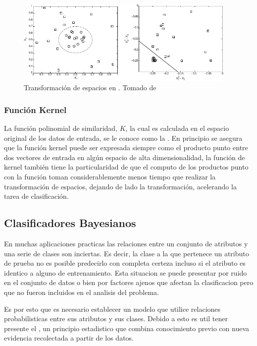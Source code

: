 \begin{figure}[H]
   \centering
   \includegraphics[width=0.95\textwidth]{Figures/svm-nonlinear-transform.pdf}
   \decoRule
   \caption[Transformación de espacios en ]{Transformación de espacios en . Tomado de \cite{tan2005introduction}}
   \label{fig:svm-nonlinear-transforms}
\end{figure}

\subsubsection{Función Kernel}
La función polinomial de similaridad, $K$, la cual es calculada en el espacio original de los datos de entrada, se le conoce como la . En principio se asegura que la función kernel puede ser expresada siempre como el producto punto entre dos vectores de entrada en algún espacio de alta dimensionalidad, la función de kernel también tiene la particularidad de que el computo de los productos punto con la función toman considerablemente menos tiempo que realizar la transformación de espacios, dejando de lado la transformación, acelerando la tarea de clasificación.


\subsection{Clasificadores Bayesianos} \label{sec:bayes}
En muchas aplicaciones practicas las relaciones entre un conjunto de atributos y una serie de clases son inciertas. Es decir, la clase a la que pertenece un atributo de prueba no es posible predecirlo con completa certeza incluso si el atributo es identico a alguno de entrenamiento. Esta situacion se puede presentar por ruido en el conjunto de datos o bien por factores ajenos que afectan la clasificacion pero que no fueron incluidos en el analisis del problema.

Es por esto que es necesario establecer un modelo que utilice relaciones probabilisticas entre sus atributos y sus clases. Debido a esto es util tener presente el , un principio estadistico que combina conocimiento previo con nueva evidencia recolectada a partir de los datos.

